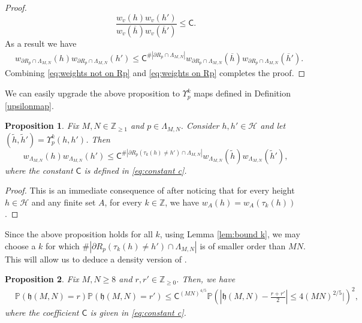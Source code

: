 \documentclass[reqno,11pt]{amsart}
\newcommand{\h}{\mathfrak{h}}
\numberwithin{equation}{section}
\newtheorem{proposition}{Proposition}[section]
\theoremstyle{definition}
\newcommand{\Z}{\mathbb{Z}}
\begin{document}
\begin{proof}
    \begin{equation*}
        \frac{ w_v(h) w_v(h') }{ w_v(\overline{h}) w_v(\overline{h}') }  \le \mathsf{C}.
    \end{equation*}
    As a result we have 
    \begin{equation} \label{eq:weights on Rp}
    \begin{split}
        &w_{\partial R_p \cap \Lambda_{M,N} }(h) w_{\partial R_p \cap \Lambda_{M,N} }(h') 
         \le \mathsf{C}^{\#\left| \partial R_p\cap \Lambda_{M,N} \right|} w_{\partial R_p\cap \Lambda_{M,N} }(\overline{h}) w_{\partial R_p \cap \Lambda_{M,N} }(\overline{h}').
    \end{split}
    \end{equation}
    Combining \eqref{eq:weights not on Rp} and \eqref{eq:weights on Rp} completes the proof.
\end{proof}

We can easily upgrade the above proposition to $\Upsilon_p^k$ maps defined in Definition \ref{upsilonmap}.

\begin{proposition} \label{prop:bound weights contraction}
    Fix $M,N\in \mathbb{Z}_{\ge 1}$ and $p\in \Lambda_{M,N}$. Consider $h,h' \in \mathscr{H}$ and let $ (\widetilde{h},\widetilde{h}') = \Upsilon_p^k (h,h')$. Then
    \begin{equation*}
        w_{\Lambda_{M,N}}(h) w_{\Lambda_{M,N}} (h') \le  \mathsf{C}^{\#\left| \partial R_p(\tau_k(h)\neq h') \cap \Lambda_{M,N} \right|} w_{\Lambda_{M,N}} (\widetilde{h}) w_{\Lambda_{M,N}} (\widetilde{h}'),
    \end{equation*}
    where the constant $\mathsf{C}$ is defined in \eqref{eq:constant c}.
\end{proposition}
\begin{proof}
    This is an immediate consequence of  after noticing that for every height $h \in \mathscr{H}$ and any finite set $A$, for every $k\in \mathbb{Z}$, we have $w_A(h) = w_A(\tau_k(h))$.
\end{proof}

Since the above proposition holds for all $k$, using Lemma \ref{lem:bound k}, we may choose a $k$ for which $\#\left| \partial R_p(\tau_k(h)\neq h') \cap \Lambda_{M,N} \right|$ is of smaller order than $MN$. This will allow us to deduce a density version of .

\begin{proposition} \label{prop: weak log concavity}
    Fix $M,N \ge 8$ and $r,r'\in \Z_{\ge 0}$. Then, we have
    \begin{equation} \label{eq: weak log concavity}
        \begin{split}
            & \mathbb{P}(\h(M,N)=r) \mathbb{P}(\h(M,N)=r')
            \le \mathsf{C}^{(MN)^{4/5}} \mathbb{P} \left(  \left| \h(M,N) - \frac{r+r'}{2} \right| \le 4(MN)^{2/5} \bigg| \right)^2,
        \end{split}
    \end{equation}
   where the coefficient $\mathsf{C}$ is given in \eqref{eq:constant c}. 
\end{proposition}
\end{document}
